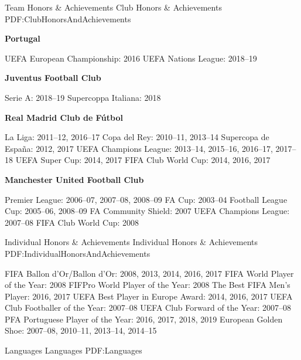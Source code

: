 \documentclass[letterpaper,MMMyyyy,nonstopmode]{simpleresumecv}
\begin{document}
\begin{Body}

\Section
{Team Honors \&\newline
Achievements}
{Club Honors \& Achievements}
{PDF:ClubHonorsAndAchievements}

\Entry
{\textbf{Portugal}}

\Gap
\BulletItem
UEFA European Championship: 2016
\BulletItem
UEFA Nations League: 2018–19

\Entry
{\textbf{Juventus Football Club}}

\Gap
\BulletItem
Serie A: 2018–19
\BulletItem
Supercoppa Italiana: 2018

\Entry
{\textbf{Real Madrid Club de Fútbol}}

\Gap
\BulletItem
La Liga: 2011–12, 2016–17
\BulletItem
Copa del Rey: 2010–11, 2013–14
\BulletItem
Supercopa de España: 2012, 2017
\BulletItem
UEFA Champions League: 2013–14, 2015–16, 2016–17, 2017–18
\BulletItem
UEFA Super Cup: 2014, 2017
\BulletItem
FIFA Club World Cup: 2014, 2016, 2017

\Entry
{\textbf{Manchester United Football Club}}

\Gap
\BulletItem
Premier League: 2006–07, 2007–08, 2008–09
\BulletItem
FA Cup: 2003–04
\BulletItem
Football League Cup: 2005–06, 2008–09
\BulletItem
FA Community Shield: 2007
\BulletItem
UEFA Champions League: 2007–08
\BulletItem
FIFA Club World Cup: 2008


\Section
{Individual Honors \&\newline
Achievements}
{Individual Honors \& Achievements}
{PDF:IndividualHonorsAndAchievements}

\BulletItem
FIFA Ballon d'Or/Ballon d'Or: 2008, 2013, 2014, 2016, 2017
\BulletItem
FIFA World Player of the Year: 2008
\BulletItem
FIFPro World Player of the Year: 2008
\BulletItem
The Best FIFA Men's Player: 2016, 2017
\BulletItem
UEFA Best Player in Europe Award: 2014, 2016, 2017
\BulletItem
UEFA Club Footballer of the Year: 2007–08
\BulletItem
UEFA Club Forward of the Year: 2007–08
\BulletItem
PFA Portuguese Player of the Year: 2016, 2017, 2018, 2019
\BulletItem
European Golden Shoe: 2007–08, 2010–11, 2013–14, 2014–15


\Section
{Languages}
{Languages}
{PDF:Languages}


\end{Body}
\end{document}

